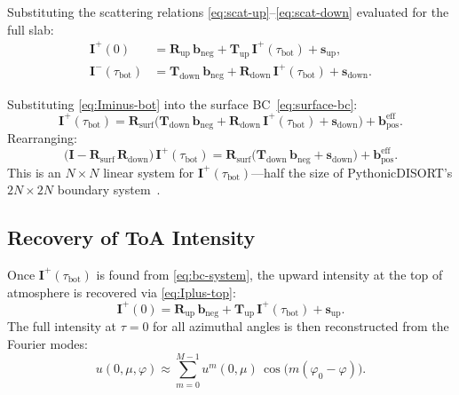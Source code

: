 \documentclass[11pt,a4paper]{article}
\newcommand{\vect}[1]{\bm{#1}}
\newcommand{\mat}[1]{\mathbf{#1}}
\newcommand{\tbot}{\tau_{\mathrm{bot}}}
\theoremstyle{definition}
\begin{document}
Substituting the scattering relations \eqref{eq:scat-up}--\eqref{eq:scat-down}
evaluated for the full slab:
\begin{align}
  \vect{I}^+(0) &= \mat{R}_{\mathrm{up}}\,\vect{b}_{\mathrm{neg}}
    + \mat{T}_{\mathrm{up}}\,\vect{I}^+(\tbot)
    + \vect{s}_{\mathrm{up}}, \label{eq:Iplus-top} \\
  \vect{I}^-(\tbot) &= \mat{T}_{\mathrm{down}}\,\vect{b}_{\mathrm{neg}}
    + \mat{R}_{\mathrm{down}}\,\vect{I}^+(\tbot)
    + \vect{s}_{\mathrm{down}}.  \label{eq:Iminus-bot}
\end{align}

Substituting \eqref{eq:Iminus-bot} into the surface
BC~\eqref{eq:surface-bc}:
\begin{equation}
  \vect{I}^+(\tbot)
  = \mat{R}_{\mathrm{surf}}\bigl(
      \mat{T}_{\mathrm{down}}\,\vect{b}_{\mathrm{neg}}
      + \mat{R}_{\mathrm{down}}\,\vect{I}^+(\tbot)
      + \vect{s}_{\mathrm{down}}\bigr)
    + \vect{b}_{\mathrm{pos}}^{\mathrm{eff}}.
\end{equation}
Rearranging:
\begin{equation}\label{eq:bc-system}
  \boxed{
    \bigl(\mat{I} - \mat{R}_{\mathrm{surf}}\,\mat{R}_{\mathrm{down}}\bigr)\,
    \vect{I}^+(\tbot)
    = \mat{R}_{\mathrm{surf}}\bigl(
        \mat{T}_{\mathrm{down}}\,\vect{b}_{\mathrm{neg}}
        + \vect{s}_{\mathrm{down}}\bigr)
      + \vect{b}_{\mathrm{pos}}^{\mathrm{eff}}.
  }
\end{equation}
This is an $N\!\times\!N$ linear system for $\vect{I}^+(\tbot)$---half
the size of PythonicDISORT's $2N\!\times\!2N$ boundary
system~\cite[Section~3.7]{HP2024doc}.

\subsection{Recovery of ToA Intensity}

Once $\vect{I}^+(\tbot)$ is found from \eqref{eq:bc-system}, the
upward intensity at the top of atmosphere is recovered via
\eqref{eq:Iplus-top}:
\begin{equation}\label{eq:recovery}
  \vect{I}^+(0)
  = \mat{R}_{\mathrm{up}}\,\vect{b}_{\mathrm{neg}}
    + \mat{T}_{\mathrm{up}}\,\vect{I}^+(\tbot)
    + \vect{s}_{\mathrm{up}}.
\end{equation}
The full intensity at $\tau = 0$ for all azimuthal angles is then
reconstructed from the Fourier modes:
\begin{equation}
  u(0, \mu, \varphi)
  \approx \sum_{m=0}^{M-1}
    u^m(0, \mu)\,\cos\bigl(m(\varphi_0 - \varphi)\bigr).
\end{equation}
\end{document}
